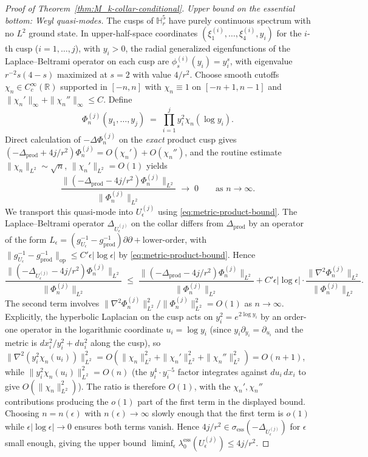 \documentclass[11pt,letterpaper]{article}
\theoremstyle{definition}
\newcommand{\bbR}{\mathbb{R}}
\newcommand{\bbH}{\mathbb{H}}
\newcommand{\Lap}{\Delta}
\begin{document}
\begin{proof}[Proof of Theorem~\ref{thm:M_k-collar-conditional}]
\emph{Upper bound on the essential bottom: Weyl quasi-modes.}
The cusps of $\bbH^5_r$ have purely continuous spectrum with no $L^2$ ground state. In upper-half-space coordinates $(\xi^{(i)}_1, \ldots, \xi^{(i)}_4, y_i)$ for the $i$-th cusp ($i = 1, \ldots, j$), with $y_i > 0$, the radial generalized eigenfunctions of the Laplace--Beltrami operator on each cusp are $\phi^{(i)}_s(y_i) = y_i^s$, with eigenvalue $r^{-2}s(4-s)$ maximized at $s = 2$ with value $4/r^2$. Choose smooth cutoffs $\chi_n \in C_c^\infty(\bbR)$ supported in $[-n, n]$ with $\chi_n \equiv 1$ on $[-n+1, n-1]$ and $\|\chi_n'\|_\infty + \|\chi_n''\|_\infty \le C$. Define
\[
\Phi^{(j)}_n(y_1, \ldots, y_j) \;=\; \prod_{i=1}^j y_i^2 \chi_n(\log y_i).
\]
Direct calculation of $-\Lap\Phi^{(j)}_n$ on the \emph{exact} product cusp gives $(-\Lap_{\mathrm{prod}} + 4j/r^2)\Phi^{(j)}_n = O(\chi_n') + O(\chi_n'')$, and the routine estimate $\|\chi_n\|_{L^2} \sim \sqrt{n}$, $\|\chi_n'\|_{L^2} = O(1)$ yields
\[
\frac{\|(-\Lap_{\mathrm{prod}} - 4j/r^2)\Phi^{(j)}_n\|_{L^2}}{\|\Phi^{(j)}_n\|_{L^2}} \;\longrightarrow\; 0\qquad\text{as } n \to \infty.
\]
We transport this quasi-mode into $U_\epsilon^{(j)}$ using \eqref{eq:metric-product-bound}. The Laplace--Beltrami operator $\Lap_{U_\epsilon^{(j)}}$ on the collar differs from $\Lap_{\mathrm{prod}}$ by an operator of the form $L_\epsilon = (g_{U_\epsilon}^{-1} - g_{\mathrm{prod}}^{-1})\partial\partial + \text{lower-order}$, with $\|g_{U_\epsilon}^{-1} - g_{\mathrm{prod}}^{-1}\|_{\mathrm{op}} \le C'\epsilon|\log\epsilon|$ by \eqref{eq:metric-product-bound}. Hence
\[
\frac{\|(-\Lap_{U_\epsilon^{(j)}} - 4j/r^2)\Phi^{(j)}_n\|_{L^2}}{\|\Phi^{(j)}_n\|_{L^2}} \;\le\; \frac{\|(-\Lap_{\mathrm{prod}} - 4j/r^2)\Phi^{(j)}_n\|_{L^2}}{\|\Phi^{(j)}_n\|_{L^2}} + C'\epsilon|\log\epsilon|\cdot\frac{\|\nabla^2 \Phi^{(j)}_n\|_{L^2}}{\|\Phi^{(j)}_n\|_{L^2}}.
\]
The second term involves $\|\nabla^2\Phi^{(j)}_n\|_{L^2}^2/\|\Phi^{(j)}_n\|_{L^2}^2 = O(1)$ as $n\to\infty$. Explicitly, the hyperbolic Laplacian on the cusp acts on $y_i^2 = e^{2\log y_i}$ by an order-one operator in the logarithmic coordinate $u_i = \log y_i$ (since $y_i\partial_{y_i} = \partial_{u_i}$ and the metric is $dx_i^2/y_i^2 + du_i^2$ along the cusp), so $\|\nabla^2(y_i^2\chi_n(u_i))\|_{L^2}^2 = O(\|\chi_n\|_{L^2}^2 + \|\chi_n'\|_{L^2}^2 + \|\chi_n''\|_{L^2}^2) = O(n + 1)$, while $\|y_i^2\chi_n(u_i)\|_{L^2}^2 = O(n)$ (the $y_i^4 \cdot y_i^{-5}$ factor integrates against $du_i\,dx_i$ to give $O(\|\chi_n\|_{L^2}^2)$). The ratio is therefore $O(1)$, with the $\chi_n', \chi_n''$ contributions producing the $o(1)$ part of the first term in the displayed bound. Choosing $n = n(\epsilon)$ with $n(\epsilon) \to \infty$ slowly enough that the first term is $o(1)$ while $\epsilon|\log\epsilon|\to 0$ ensures both terms vanish. Hence $4j/r^2 \in \sigma_{\mathrm{ess}}(-\Lap_{U_\epsilon^{(j)}})$ for $\epsilon$ small enough, giving the upper bound $\liminf_\epsilon \lambda_0^{\mathrm{ess}}(U_\epsilon^{(j)}) \le 4j/r^2$.


\end{proof}
\end{document}
